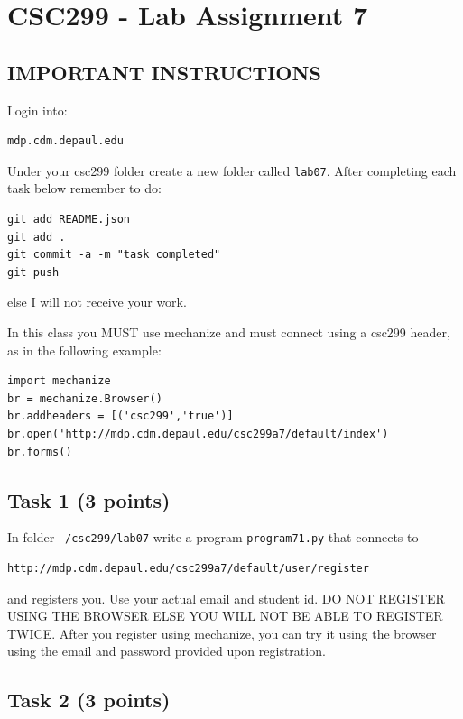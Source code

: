 \documentclass[12pt]{article}
\begin{document}
\section{CSC299 - Lab Assignment 7}

\subsection*{IMPORTANT INSTRUCTIONS}

\noindent Login into:
\begin{verbatim}
mdp.cdm.depaul.edu
\end{verbatim}

\noindent Under your csc299 folder create a new folder called {\tt lab07}.
\noindent After completing each task below remember to do:

\begin{verbatim}
git add README.json
git add .
git commit -a -m "task completed"
git push
\end{verbatim}

\noindent  else I will not receive your work.

\noindent In this class you MUST use mechanize and must connect using a csc299 header, as in the following example:

\begin{verbatim}
import mechanize
br = mechanize.Browser()
br.addheaders = [('csc299','true')]
br.open('http://mdp.cdm.depaul.edu/csc299a7/default/index')
br.forms()
\end{verbatim}

\subsection{Task 1 (3 points)}

\noindent  In folder {\tt ~/csc299/lab07} write a program {\tt program71.py} that connects to 

\begin{verbatim}
http://mdp.cdm.depaul.edu/csc299a7/default/user/register
\end{verbatim}

and registers you. Use your actual email and student id.
DO NOT REGISTER USING THE BROWSER ELSE YOU WILL NOT BE ABLE TO REGISTER TWICE.
After you register using mechanize, you can try it using the browser using the email and password provided upon registration.

\subsection{Task 2 (3 points)}
\end{document}
